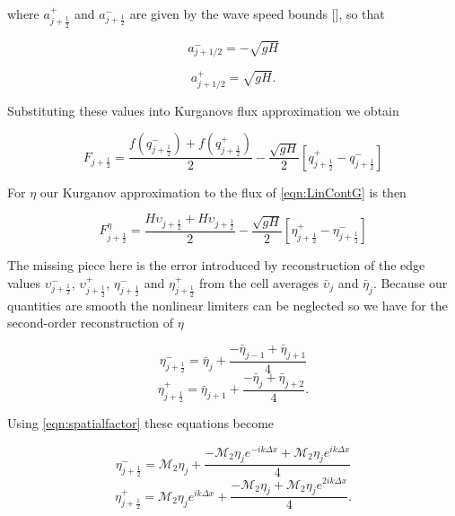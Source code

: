 \documentclass[12pt]{article}
\begin{document}
where $a^+_{j+\frac{1}{2}}$ and $a^-_{j+\frac{1}{2}}$ are given by the wave speed bounds [], so that 

\[a^-_{j+ 1/2} =  - \sqrt{g H}\]

\[a^+_{j+ 1/2} = \sqrt{g H}.\]

Substituting these values into Kurganovs flux approximation we obtain 

\begin{equation}\label{eqn:HLL_fluxred}
F_{j+\frac{1}{2}} = \dfrac{ f\left(q^-_{j+\frac{1}{2}}\right) + f\left(q^+_{j+\frac{1}{2}}\right)}{ 2}  - \dfrac{ \sqrt{gH}}{ 2} \left [ q^+_{j+\frac{1}{2}} - q^-_{j+\frac{1}{2}} \right ]
\end{equation}

For $\eta$ our Kurganov approximation to the flux of \eqref{eqn:LinContG} is then


\begin{equation}
\label{eqn:HLL_fluxeta}
F^{\eta}_{j+\frac{1}{2}} = \dfrac{ H \upsilon_{j+\frac{1}{2}}+ H \upsilon_{j+\frac{1}{2}}}{ 2}  - \dfrac{ \sqrt{gH}}{ 2} \left [ \eta^+_{j+\frac{1}{2}} - \eta^-_{j+\frac{1}{2}} \right ]
\end{equation}

The missing piece here is the error introduced by reconstruction of the edge values $\upsilon ^-_{j+\frac{1}{2}}$, $\upsilon ^+_{j+\frac{1}{2}}$, $\eta ^-_{j+\frac{1}{2}}$ and $\eta ^+_{j+\frac{1}{2}}$ from the cell averages $\bar{\upsilon}_j$ and $\bar{\eta}_j$. Because our quantities are smooth the nonlinear limiters can be neglected so we have for the second-order reconstruction of $\eta$ 


\begin{equation*}
\eta^-_{j+\frac{1}{2}} = \bar{\eta}_j + \frac{- \bar{\eta}_{j - 1} + \bar{\eta}_{j+ 1} }{4}
\end{equation*}
\begin{equation*}
\eta^+_{j+\frac{1}{2}} = \bar{\eta}_{j+1} + \frac{- \bar{\eta}_{j} + \bar{\eta}_{j+ 2}}{4}.
\end{equation*}


Using \eqref{eqn:spatialfactor} these equations become


\begin{equation*}
\eta^-_{j+\frac{1}{2}} = \mathcal{M}_2{\eta}_j + \frac{- \mathcal{M}_2{\eta}_{j} e^{-ik\Delta x} + \mathcal{M}_2{\eta}_{j} e^{ik\Delta x}}{4}
\end{equation*}
\begin{equation*}
\eta^+_{j+\frac{1}{2}} = \mathcal{M}_2{\eta}_{j}e^{ik\Delta x} + \frac{- \mathcal{M}_2{\eta}_{j} + \mathcal{M}_2{\eta}_{j}e^{2ik\Delta x} }{4}.
\end{equation*}
\end{document}
